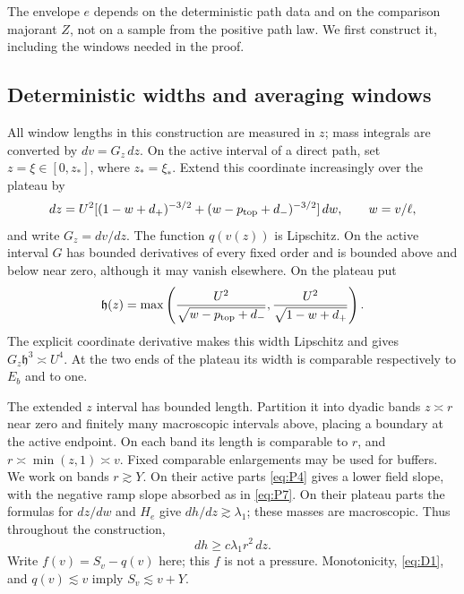 The envelope $e$ depends on the deterministic path data and on the
comparison majorant $Z$, not on a sample from the positive path law.
We first construct it, including the windows needed in the proof.

\subsection{Deterministic widths and averaging windows}
All window lengths in this construction are measured in $z$;
mass integrals are converted by $dv=G_z\,dz$.  On the active interval
of a direct path, set $z=\xi\in[0,z_*]$, where $z_*=\xi_*$.
Extend this coordinate increasingly over the plateau by
\begin{equation*}
 dz=U^2[(1-w+d_+)^{-3/2}+(w-p_{\rm top}+d_-)^{-3/2}]\,dw,
 \qquad w=v/\ell,
\end{equation*}
and write $G_z=dv/dz$.  The function $q(v(z))$ is Lipschitz.  On the
active interval $G$ has bounded derivatives of every fixed order and
is bounded above and below near zero, although it may vanish elsewhere.
On the plateau put
\[
 \mathfrak h(z)=\max\left(
       \frac{U^2}{\sqrt{w-p_{\rm top}+d_-}},
       \frac{U^2}{\sqrt{1-w+d_+}}\right).
\]
The explicit coordinate derivative makes this width Lipschitz and
gives $G_z\mathfrak h^3\asymp U^4$.  At the two ends of the plateau
its width is comparable respectively to $E_b$ and to one.

The extended $z$ interval has bounded length.  Partition it into dyadic
bands $z\asymp r$ near zero and finitely many macroscopic intervals
above, placing a boundary at the active endpoint.  On each band its
length is comparable to $r$, and
$r\asymp\min(z,1)\asymp v$.  Fixed comparable enlargements may be
used for buffers.  We work on bands $r\gtrsim Y$.
On their active parts \eqref{eq:P4} gives a lower field slope, with
the negative ramp slope absorbed as in \eqref{eq:P7}.  On their plateau
parts the formulas for $dz/dw$ and $H_e$ give $dh/dz\gtrsim\lambda_1$;
these masses are macroscopic.  Thus throughout the construction,
\begin{equation}
 dh\ge c\lambda_1r^2\,dz.                                        \tag{D3}\label{eq:D3}
\end{equation}
Write $f(v)=S_v-q(v)$ here; this $f$ is not a pressure.
Monotonicity, \eqref{eq:D1}, and $q(v)\lesssim v$ imply
$S_v\lesssim v+Y$.

